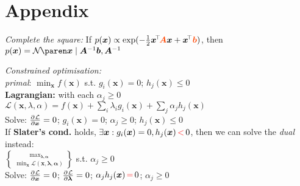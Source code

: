 \section{Appendix}

\emph{Complete the square:}
If $p(\bm x) \propto \exp(-\frac12 \bm x\!^\top \!\bm{{\color{OrangeRed} A}x} + \bm x\!^\top \begingroup \color{OrangeRed} \bm b \endgroup)$,
then $p(\bm x) = \Gauss{\bm x \mid \bm A^{-1} \bm b, \bm A^{-1}}$

\emph{Constrained optimisation:}
\\
\textit{primal}: \enspace $\min_{\bm x} f(\bm x)$ \enspace s.t. \enspace $g_i(\bm x) = 0$; \enspace $h_j(\bm x) \leq 0$
\\
\textbf{Lagrangian:} \enspace with each $\alpha_j \geq 0$\\
\enspace $\mathcal L(\bm x,\lambda,\alpha) = f(\bm x) + \sum_i \lambda_i g_i(\bm x) + \sum_j \alpha_j h_j(\bm x)$
\\
Solve: \: $\pderiv{\mathcal L}{\bm x} = 0$; \: $g_i(\bm x) = 0$; \: $\alpha_j \geq 0$; \: $h_j(\bm x) \leq 0$
\\
If \textbf{Slater's cond.} holds, $\exists \bm x : g_i(\bm x) = 0, h_j(\bm x) {\color{red}\,<\,} 0$, then we can solve the \textit{dual} instead:\\
\enskip $\max_{\bm \lambda, \bm \alpha} \brace{ \min_{\bm x} \mathcal L(\bm x, \bm \lambda, \bm \alpha) }$ \: s.t. \: $\alpha_j \geq 0$\\
Solve: \: $\pderiv{\mathcal L}{\bm x} = 0$; \: $\pderiv{\mathcal L}{\bm \lambda} = 0$; \: $\alpha_j h_j(\bm x) {\color{red}\,=\,} 0$; \: $\alpha_j \geq 0$

\iffalse
    \emph{Lagrange Multipliers: \color{red} OLD VERSION}
    \\
    Problem $\mathcal P : \begin{cases}
        \min f(\bm x),      & \bm x\in\mathbb R^d \\
        \text{s.t. } g_i(\bm x)=0,      & i\leq m \\
        \phantom{\text{s.t. }} h_j(\bm x) \leq 0,       & j\leq n
    \end{cases}$
    \\
    Lagrangian: $\mathcal L(\bm x,\lambda,\alpha) = f(\bm x) + \sum_{i\leq m} \lambda_i g_i(\bm x) + \sum_{j\leq n} \alpha_j h_j(\bm x)$ with each $\alpha_j \geq 0$.
    \\
    Solution must satisfy
    $\pderiv{\mathcal L}{\bm x} = 0$ and $\pderiv{\mathcal L}{\lambda} = 0$,
    $\alpha_j h_j(\bm x) = 0$, and
    $\alpha_j \geq 0, \forall j\leq n$.
\fi

